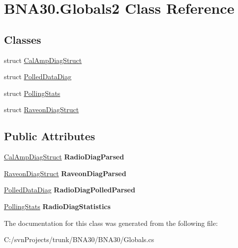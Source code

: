 \hypertarget{class_b_n_a30_1_1_globals2}{}\section{B\+N\+A30.\+Globals2 Class Reference}
\label{class_b_n_a30_1_1_globals2}
\subsection*{Classes}
\begin{DoxyCompactItemize}
\item 
struct \mbox{\hyperlink{struct_b_n_a30_1_1_globals2_1_1_cal_amp_diag_struct}{Cal\+Amp\+Diag\+Struct}}
\item 
struct \mbox{\hyperlink{struct_b_n_a30_1_1_globals2_1_1_polled_data_diag}{Polled\+Data\+Diag}}
\item 
struct \mbox{\hyperlink{struct_b_n_a30_1_1_globals2_1_1_polling_stats}{Polling\+Stats}}
\item 
struct \mbox{\hyperlink{struct_b_n_a30_1_1_globals2_1_1_raveon_diag_struct}{Raveon\+Diag\+Struct}}
\end{DoxyCompactItemize}
\subsection*{Public Attributes}
\begin{DoxyCompactItemize}
\item 
\mbox{\label{class_b_n_a30_1_1_globals2_a6c64459af28d096dfe04be509208461d}} 
\mbox{\hyperlink{struct_b_n_a30_1_1_globals2_1_1_cal_amp_diag_struct}{Cal\+Amp\+Diag\+Struct}} {\bfseries Radio\+Diag\+Parsed}
\item 
\mbox{\label{class_b_n_a30_1_1_globals2_ac3cb6416bbd447766e97fe1ecdf70167}} 
\mbox{\hyperlink{struct_b_n_a30_1_1_globals2_1_1_raveon_diag_struct}{Raveon\+Diag\+Struct}} {\bfseries Raveon\+Diag\+Parsed}
\item 
\mbox{\label{class_b_n_a30_1_1_globals2_a1cd6a3640501c9918111da78562a7c9e}} 
\mbox{\hyperlink{struct_b_n_a30_1_1_globals2_1_1_polled_data_diag}{Polled\+Data\+Diag}} {\bfseries Radio\+Diag\+Polled\+Parsed}
\item 
\mbox{\label{class_b_n_a30_1_1_globals2_a932e2fedac7b8264b3a376bb42ee621b}} 
\mbox{\hyperlink{struct_b_n_a30_1_1_globals2_1_1_polling_stats}{Polling\+Stats}} {\bfseries Radio\+Diag\+Statistics}
\end{DoxyCompactItemize}


The documentation for this class was generated from the following file\+:\begin{DoxyCompactItemize}
\item 
C\+:/svn\+Projects/trunk/\+B\+N\+A30/\+B\+N\+A30/Globals.\+cs\end{DoxyCompactItemize}
